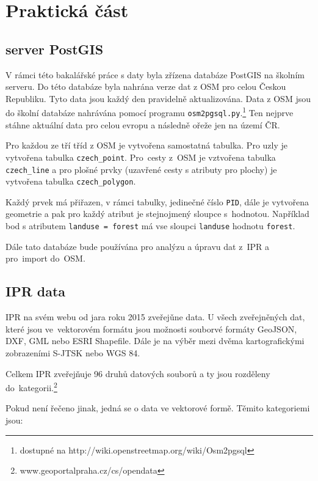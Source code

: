 \chapter{Praktická část}
\label{3-Praktická část}

\section{server PostGIS}
\label{server PostGIS}
V rámci této bakalářské práce s daty byla zřízena databáze PostGIS na školním
serveru. Do této databáze byla nahrána verze dat z OSM pro celou Českou
Republiku. Tyto data jsou každý den pravidelně aktualizována.
Data z OSM jsou do školní databáze nahrávána pomocí programu {\tt osm2pgsql.py}.\footnote{dostupné na http://wiki.openstreetmap.org/wiki/Osm2pgsql}
Ten nejprve stáhne aktuální data pro celou evropu a následně ořeže
jen na území ČR. 

Pro každou ze tří tříd z OSM je vytvořena samostatná 
tabulka. Pro uzly je vytvořena tabulka {\tt czech\_point}.
Pro~cesty z~OSM je vztvořena tabulka {\tt czech\_line} a pro plošné 
prvky (uzavřené cesty s atributy pro plochy) je vytvořena tabulka
{\tt czech\_polygon}.

Každý prvek má přiřazen, v rámci tabulky, jedinečné číslo {\tt PID}, 
dále je vytvořena geometrie a pak pro každý atribut je stejnojmený 
sloupce s~hodnotou. 
Například bod s atributem {\tt landuse = forest} má vse sloupci 
{\tt landuse} hodnotu {\tt forest}.

Dále tato databáze bude používána pro analýzu a úpravu dat z~IPR a
pro~import do~OSM.


\section{IPR data}
\label{IPR data}
IPR na svém webu od jara roku 2015 zveřejǔne data.
U všech zveřejněných dat, které jsou ve~vektorovém formátu jsou
možnosti souborvé formáty GeoJSON, DXF, GML nebo ESRI Shapefile.
Dále je na výběr mezi dvěma kartografickými zobrazeními S-JTSK nebo WGS 84.

Celkem IPR zveřejňuje 96 druhů datových souborů a ty jsou rozděleny
do~kategorii.\footnote{www.geoportalpraha.cz/cs/opendata}

Pokud není řečeno jinak, jedná se o data ve vektorové formě.
Těmito kategoriemi jsou:

